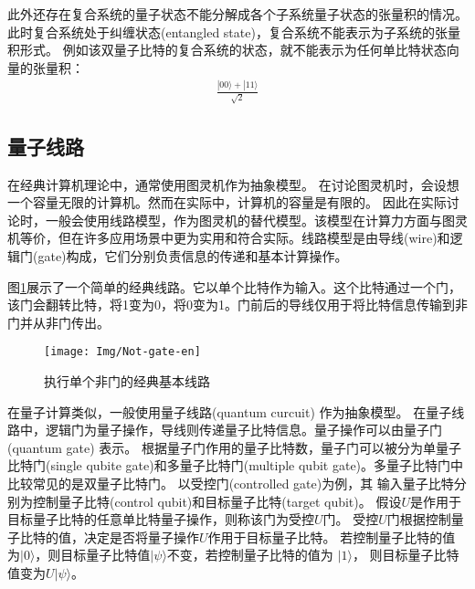 此外还存在复合系统的量子状态不能分解成各个子系统量子状态的张量积的情况。此时复合系统处于纠缠状态(entangled state)，复合系统不能表示为子系统的张量积形式。
例如该双量子比特的复合系统的状态，就不能表示为任何单比特状态向量的张量积：
\begin{align}
    \frac{|00\rangle+|11\rangle}{\sqrt{2}}
\end{align}
\subsection{量子线路}
\label{sec-cir}
在经典计算机理论中，通常使用图灵机作为抽象模型。
在讨论图灵机时，会设想一个容量无限的计算机。然而在实际中，计算机的容量是有限的。
因此在实际讨论时，一般会使用线路模型，作为图灵机的替代模型。该模型在计算力方面与图灵机等价，但在许多应用场景中更为实用和符合实际。线路模型是由导线(wire)和逻辑门(gate)构成，它们分别负责信息的传递和基本计算操作。
\begin{example}
    图\ref{fig-not}展示了一个简单的经典线路。它以单个比特作为输入。这个比特通过一个门，该门会翻转比特，将1变为0，将0变为1。门前后的导线仅用于将比特信息传输到非门并从非门传出。
\begin{figure}[htbp]
    \centering
    \texttt{[image: Img/Not-gate-en]}
    \caption{执行单个非门的经典基本线路}
    \label{fig-not}
\end{figure}
\end{example}

在量子计算类似，一般使用量子线路(quantum curcuit) 作为抽象模型。
在量子线路中，逻辑门为量子操作，导线则传递量子比特信息。量子操作可以由量子门(quantum gate) 表示。
根据量子门作用的量子比特数，量子门可以被分为单量子比特门(single qubite gate)和多量子比特门(multiple qubit gate)。多量子比特门中比较常见的是双量子比特门。
以受控门(controlled gate)为例，其
输入量子比特分别为控制量子比特(control qubit)和目标量子比特(target qubit)。
假设$U $是作用于目标量子比特的任意单比特量子操作，则称该门为受控$U$门。
受控$U$门根据控制量子比特的值，决定是否将量子操作$U$作用于目标量子比特。
若控制量子比特的值为\(|0\rangle\)，则目标量子比特值\(|\psi\rangle\)不变，若控制量子比特的值为
\(|1\rangle\)， 则目标量子比特值变为\(U|\psi\rangle\)。

